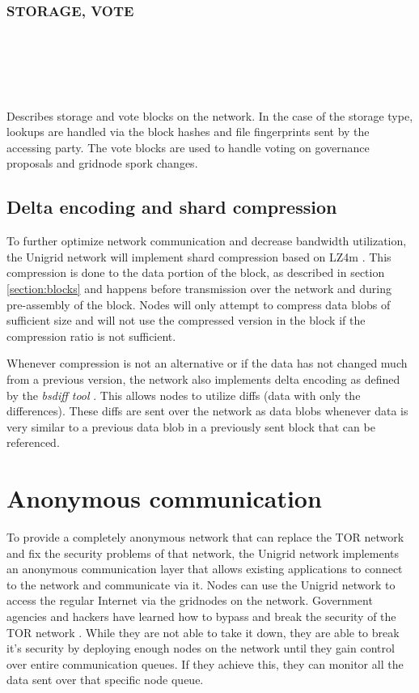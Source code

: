 \documentclass[10pt,a4paper,final]{article}
\newcommand{\colorbitbox}[3]{%
  \rlap{\bitbox{#2}{\color{#1}\rule{\width}{\height}}}%
  \bitbox{#2}{#3}
}
\begin{document}
\subsubsection{STORAGE, VOTE}
\begin{bytefield}[bitwidth=1.08em]{32}
	 \\
	\colorbitbox{lightgray}{8}{reserved} \\
	 \\
	\skippedwords \\
	\vspace{0.2cm}
\end{bytefield}
\label{block:vote}
Describes storage and vote blocks on the network. In the case of the storage type, lookups are handled via the block hashes and file fingerprints sent by the accessing party. The vote blocks are used to handle voting on governance proposals and \gls{gridnode} spork changes.

\subsection{Delta encoding and shard compression}
\label{section:delta}
To further optimize network communication and decrease bandwidth utilization, the Unigrid network will implement shard compression based on LZ4m \cite{lz42017}. This compression is done to the data portion of the block, as described in section \ref{section:blocks} and happens before transmission over the network and during pre-assembly of the block. Nodes will only attempt to compress data blobs of sufficient size and will not use the compressed version in the block if the compression ratio is not sufficient.

Whenever compression is not an alternative or if the data has not changed much from a previous version, the network also implements delta encoding as defined by the \emph{bsdiff tool} \cite{percival2006}. This allows nodes to utilize diffs (data with only the differences). These diffs are sent over the network as data blobs whenever data is very similar to a previous data blob in a previously sent block that can be referenced.

\section{Anonymous communication}
To provide a completely anonymous network that can replace the TOR network and fix the security problems of that network, the Unigrid network implements an anonymous communication layer that allows existing applications to connect to the network and communicate via it. Nodes can use the Unigrid network to access the regular Internet via the \glspl{gridnode} on the network. Government agencies and hackers have learned how to bypass and break the security of the TOR network \cite{guardian2013}. While they are not able to take it down, they are able to break it's security by deploying enough nodes on the network until they gain control over entire communication queues. If they achieve this, they can monitor all the data sent over that specific node queue.
\end{document}
